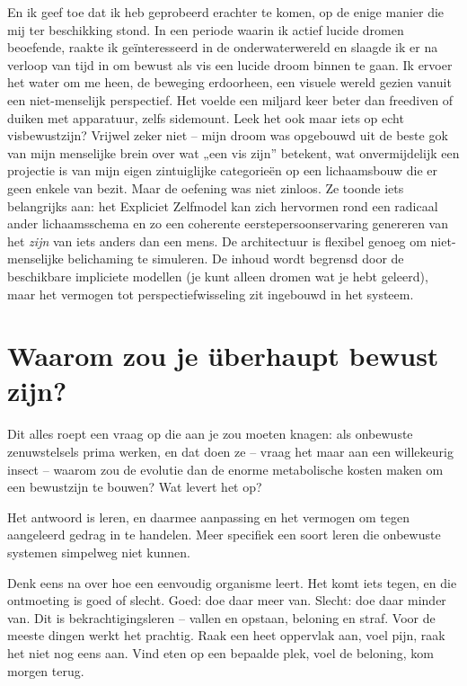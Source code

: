 \documentclass[11pt, twoside, openright]{book}
\begin{document}
En ik geef toe dat ik heb geprobeerd erachter te komen, op de enige manier die mij ter beschikking stond. In een periode waarin ik actief lucide dromen beoefende, raakte ik geïnteresseerd in de onderwaterwereld en slaagde ik er na verloop van tijd in om bewust als vis een lucide droom binnen te gaan. Ik ervoer het water om me heen, de beweging erdoorheen, een visuele wereld gezien vanuit een niet-menselijk perspectief. Het voelde een miljard keer beter dan freediven of duiken met apparatuur, zelfs sidemount. Leek het ook maar iets op echt visbewustzijn? Vrijwel zeker niet -- mijn droom was opgebouwd uit de beste gok van mijn menselijke brein over wat „een vis zijn” betekent, wat onvermijdelijk een projectie is van mijn eigen zintuiglijke categorieën op een lichaamsbouw die er geen enkele van bezit. Maar de oefening was niet zinloos. Ze toonde iets belangrijks aan: het Expliciet Zelfmodel kan zich hervormen rond een radicaal ander lichaamsschema en zo een coherente eerstepersoonservaring genereren van het \textit{zijn} van iets anders dan een mens. De architectuur is flexibel genoeg om niet-menselijke belichaming te simuleren. De inhoud wordt begrensd door de beschikbare impliciete modellen (je kunt alleen dromen wat je hebt geleerd), maar het vermogen tot perspectiefwisseling zit ingebouwd in het systeem.

\section*{Waarom zou je überhaupt bewust zijn?}

Dit alles roept een vraag op die aan je zou moeten knagen: als onbewuste zenuwstelsels prima werken, en dat doen ze -- vraag het maar aan een willekeurig insect -- waarom zou de evolutie dan de enorme metabolische kosten maken om een bewustzijn te bouwen? Wat levert het op?

Het antwoord is leren, en daarmee aanpassing en het vermogen om tegen aangeleerd gedrag in te handelen. Meer specifiek een soort leren die onbewuste systemen simpelweg niet kunnen.

Denk eens na over hoe een eenvoudig organisme leert. Het komt iets tegen, en die ontmoeting is goed of slecht. Goed: doe daar meer van. Slecht: doe daar minder van. Dit is bekrachtigingsleren -- vallen en opstaan, beloning en straf. Voor de meeste dingen werkt het prachtig. Raak een heet oppervlak aan, voel pijn, raak het niet nog eens aan. Vind eten op een bepaalde plek, voel de beloning, kom morgen terug.
\end{document}
